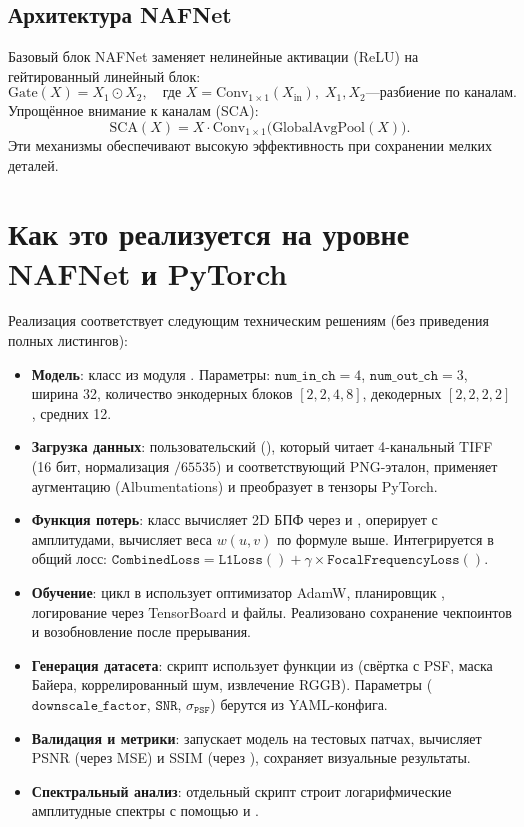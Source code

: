 \documentclass[12pt,a4paper]{article}
\begin{document}
\subsection{Архитектура NAFNet}
Базовый блок NAFNet заменяет нелинейные активации (ReLU) на гейтированный линейный блок:
\[
\text{Gate}(X) = X_1 \odot X_2,\quad \text{где } X = \text{Conv}_{1\times1}(X_{\text{in}}),\; X_1,X_2 — \text{разбиение по каналам}.
\]
Упрощённое внимание к каналам (SCA):
\[
\text{SCA}(X) = X \cdot \text{Conv}_{1\times1}\bigl(\text{GlobalAvgPool}(X)\bigr).
\]
Эти механизмы обеспечивают высокую эффективность при сохранении мелких деталей.

\section{Как это реализуется на уровне NAFNet и PyTorch}
Реализация соответствует следующим техническим решениям (без приведения полных листингов):

\begin{itemize}
    \item \textbf{Модель}: класс  из модуля . Параметры: $\mathtt{num\_in\_ch}=4$, $\mathtt{num\_out\_ch}=3$, ширина 32, количество энкодерных блоков $[2,2,4,8]$, декодерных $[2,2,2,2]$, средних 12.
    \item \textbf{Загрузка данных}: пользовательский  (), который читает 4-канальный TIFF (16 бит, нормализация ${}/65535$) и соответствующий PNG-эталон, применяет аугментацию (Albumentations) и преобразует в тензоры PyTorch.
    \item \textbf{Функция потерь}: класс  вычисляет 2D БПФ через  и , оперирует с амплитудами, вычисляет веса $w(u,v)$ по формуле выше. Интегрируется в общий лосс: $\mathtt{CombinedLoss} = \mathtt{L1Loss()} + \gamma \times \mathtt{FocalFrequencyLoss()}$.
    \item \textbf{Обучение}: цикл в  использует оптимизатор AdamW, планировщик , логирование через TensorBoard и файлы. Реализовано сохранение чекпоинтов и возобновление после прерывания.
    \item \textbf{Генерация датасета}: скрипт  использует функции из  (свёртка с PSF, маска Байера, коррелированный шум, извлечение RGGB). Параметры ($\mathtt{downscale\_factor}$, $\mathtt{SNR}$, $\sigma_{\mathtt{PSF}}$) берутся из YAML-конфига.
    \item \textbf{Валидация и метрики}:  запускает модель на тестовых патчах, вычисляет PSNR (через MSE) и SSIM (через ), сохраняет визуальные результаты.
    \item \textbf{Спектральный анализ}: отдельный скрипт  строит логарифмические амплитудные спектры с помощью  и .
\end{itemize}
\end{document}
